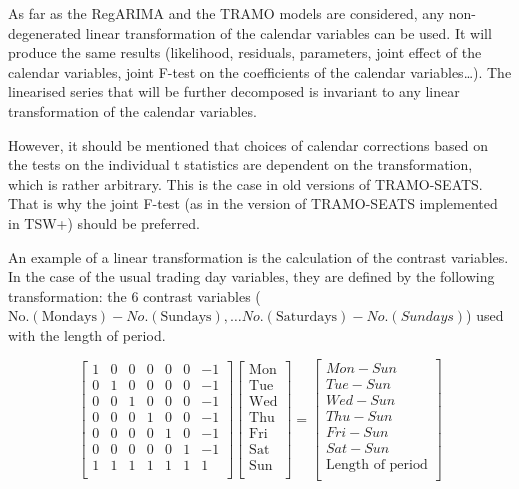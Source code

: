 \documentclass[
  letterpaper,
  DIV=11,
  numbers=noendperiod]{scrreprt}
\begin{document}
As far as the RegARIMA and the TRAMO models are considered, any
non-degenerated linear transformation of the calendar variables can be
used. It will produce the same results (likelihood, residuals,
parameters, joint effect of the calendar variables, joint F-test on the
coefficients of the calendar variables\ldots). The linearised series
that will be further decomposed is invariant to any linear
transformation of the calendar variables.

However, it should be mentioned that choices of calendar corrections
based on the tests on the individual t statistics are dependent on the
transformation, which is rather arbitrary. This is the case in old
versions of TRAMO-SEATS. That is why the joint F-test (as in the version
of TRAMO-SEATS implemented in TSW+) should be preferred.

An example of a linear transformation is the calculation of the contrast
variables. In the case of the usual trading day variables, they are
defined by the following transformation: the 6 contrast variables
(\(\text{No.}\left( \text{Mondays} \right) - No.\left( \text{Sundays} \right),\ldots No.\left( \text{Saturdays} \right) - No.(Sundays)\))
used with the length of period.

\[\begin{bmatrix}                 
  1 & 0 & 0 & 0 & 0 & 0 & - 1 \\    
  0 & 1 & 0 & 0 & 0 & 0 & - 1 \\    
  0 & 0 & 1 & 0 & 0 & 0 & - 1 \\    
  0 & 0 & 0 & 1 & 0 & 0 & - 1 \\    
  0 & 0 & 0 & 0 & 1 & 0 & - 1 \\    
  0 & 0 & 0 & 0 & 0 & 1 & - 1 \\    
  1 & 1 & 1 & 1 & 1 & 1 & 1 \\      
  \end{bmatrix}\begin{bmatrix}      
  \text{Mon} \\                     
  \text{Tue} \\                     
  \text{Wed} \\                     
  \text{Thu} \\                     
  \text{Fri} \\                     
  \text{Sat} \\                     
  \text{Sun} \\                     
  \end{bmatrix} = \begin{bmatrix}   
  Mon - Sun \\                      
  Tue - Sun \\                      
  Wed - Sun \\                      
  Thu - Sun \\                      
  Fri - Sun \\                      
  Sat - Sun \\                      
  \text{Length of period} \\      
  \end{bmatrix}\]
\end{document}
